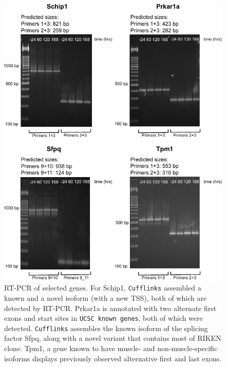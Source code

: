 \documentclass[12pt]{amsart}
\theoremstyle{definition}
\begin{document}
\begin{figure}[h] 
    \includegraphics{pdfs/Additional_RT-PCR.pdf}
    \caption[RT-PCR validation of selected genes]{RT-PCR of selected genes.  For Schip1, {\tt Cufflinks} assembled a known and a novel isoform (with a new TSS), both of which are detected by RT-PCR.  Prkar1a is annotated with two alternate first exons and start sites in {\tt UCSC known genes}, both of which were detected. {\tt Cufflinks} assembles the known isoform of the splicing factor Sfpq, along with a novel variant that contains most of RIKEN clone. Tpm1, a gene known to have muscle- and non-muscle-specific isoforms displays previously observed alternative first and last exons.   \label{RT-PCR}}
\end{figure}
\end{document}
